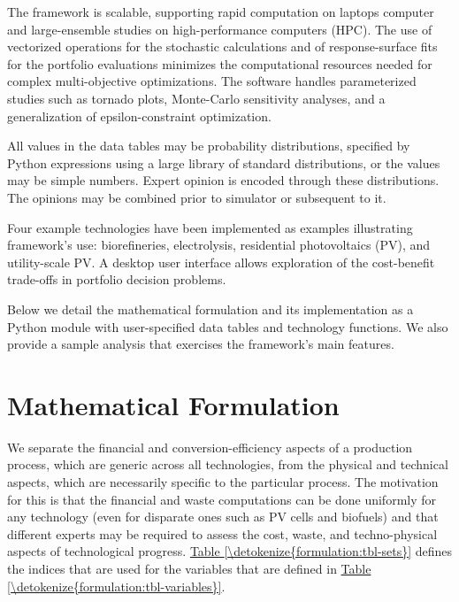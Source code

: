 \documentclass[letterpaper,10pt,english]{sphinxmanual}
\begin{document}
The framework is scalable, supporting rapid computation on laptops
computer and large-ensemble studies on high-performance computers (HPC).
The use of vectorized operations for the stochastic calculations and of
response-surface fits for the portfolio evaluations minimizes the
computational resources needed for complex multi-objective
optimizations. The software handles parameterized studies such as
tornado plots, Monte-Carlo sensitivity analyses, and a generalization of
epsilon-constraint optimization.

All values in the data tables may be probability distributions,
specified by Python expressions using a large library of standard
distributions, or the values may be simple numbers. Expert opinion is
encoded through these distributions. The opinions may be combined prior
to simulator or subsequent to it.

Four example technologies have been implemented as examples illustrating
framework’s use: biorefineries, electrolysis, residential photovoltaics
(PV), and utility-scale PV. A desktop user interface allows exploration
of the cost-benefit trade-offs in portfolio decision problems.

Below we detail the mathematical formulation and its implementation as a
Python module with user-specified data tables and technology functions.
We also provide a sample analysis that exercises the framework’s main
features.


\chapter{Mathematical Formulation}
\label{\detokenize{formulation:mathematical-formulation}}\label{\detokenize{formulation::doc}}
We separate the financial and conversion-efficiency aspects of a
production process, which are generic across all technologies, from the
physical and technical aspects, which are necessarily specific to the
particular process. The motivation for this is that the financial and
waste computations can be done uniformly for any technology (even for
disparate ones such as PV cells and biofuels) and that different experts
may be required to assess the cost, waste, and techno-physical aspects
of technological progress. \hyperref[\detokenize{formulation:tbl-sets}]{Table \ref{\detokenize{formulation:tbl-sets}}} defines the indices that are used
for the variables that are defined in \hyperref[\detokenize{formulation:tbl-variables}]{Table \ref{\detokenize{formulation:tbl-variables}}}.
\end{document}
